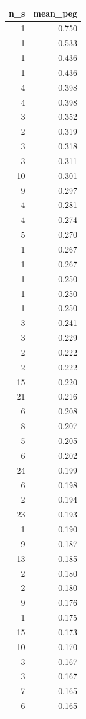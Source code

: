 \begin{tabular}{rr}
\toprule
n_s & mean_peg \\
\midrule
1 & 0.750 \\
1 & 0.533 \\
1 & 0.436 \\
1 & 0.436 \\
4 & 0.398 \\
4 & 0.398 \\
3 & 0.352 \\
2 & 0.319 \\
3 & 0.318 \\
3 & 0.311 \\
10 & 0.301 \\
9 & 0.297 \\
4 & 0.281 \\
4 & 0.274 \\
5 & 0.270 \\
1 & 0.267 \\
1 & 0.267 \\
1 & 0.250 \\
1 & 0.250 \\
1 & 0.250 \\
3 & 0.241 \\
3 & 0.229 \\
2 & 0.222 \\
2 & 0.222 \\
15 & 0.220 \\
21 & 0.216 \\
6 & 0.208 \\
8 & 0.207 \\
5 & 0.205 \\
6 & 0.202 \\
24 & 0.199 \\
6 & 0.198 \\
2 & 0.194 \\
23 & 0.193 \\
1 & 0.190 \\
9 & 0.187 \\
13 & 0.185 \\
2 & 0.180 \\
2 & 0.180 \\
9 & 0.176 \\
1 & 0.175 \\
15 & 0.173 \\
10 & 0.170 \\
3 & 0.167 \\
3 & 0.167 \\
7 & 0.165 \\
6 & 0.165 \\

\end{tabular}
